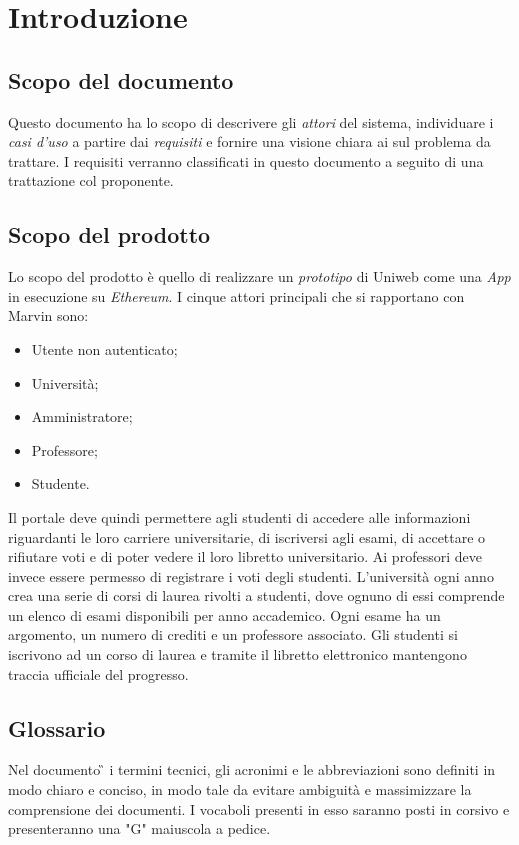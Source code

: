 \section{Introduzione}
\subsection{Scopo del documento}
Questo documento ha lo scopo di descrivere gli \emph{attori} del sistema, individuare i \emph{casi d'uso} a partire dai \emph{requisiti} e fornire una visione chiara ai \progs{} sul problema da trattare. I requisiti verranno classificati in questo documento a seguito di una trattazione col proponente.

\subsection{Scopo del prodotto}
Lo scopo del prodotto è quello di realizzare un \emph{prototipo} di Uniweb come una \emph{\DJ App} in esecuzione su \emph{Ethereum}. I cinque attori principali che si rapportano con Marvin sono:
\begin{itemize}
	\item Utente non autenticato; 
	\item Università;
	\item Amministratore;
	\item Professore;
	\item Studente.
\end{itemize} 
Il portale deve quindi permettere agli studenti di accedere alle informazioni riguardanti le loro carriere universitarie, di iscriversi agli esami, di accettare o rifiutare voti e di poter vedere il loro libretto universitario.
Ai professori deve invece essere permesso di registrare i voti degli studenti.
L'università ogni anno crea una serie di corsi di laurea rivolti a studenti, dove ognuno di essi comprende un elenco di esami disponibili per anno accademico. Ogni esame ha un argomento, un numero di crediti e un professore associato. Gli studenti si iscrivono ad un corso di laurea e tramite il libretto elettronico mantengono traccia ufficiale del progresso.

\subsection{Glossario}
Nel documento \G{} i termini tecnici, gli acronimi e le abbreviazioni sono definiti in modo chiaro e conciso, in modo tale da evitare ambiguità e massimizzare la comprensione dei documenti.
\newline I vocaboli presenti in esso saranno posti in corsivo e presenteranno una "G" maiuscola a pedice.
